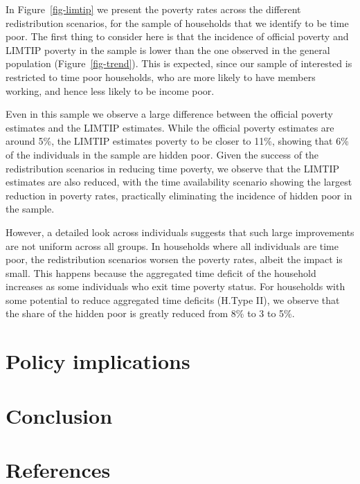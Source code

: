 \documentclass[
  11pt,
]{article}
\begin{document}
In Figure~\ref{fig-limtip} we present the poverty rates across the
different redistribution scenarios, for the sample of households that we
identify to be time poor. The first thing to consider here is that the
incidence of official poverty and LIMTIP poverty in the sample is lower
than the one observed in the general population
(Figure~\ref{fig-trend}). This is expected, since our sample of
interested is restricted to time poor households, who are more likely to
have members working, and hence less likely to be income poor.

Even in this sample we observe a large difference between the official
poverty estimates and the LIMTIP estimates. While the official poverty
estimates are around 5\%, the LIMTIP estimates poverty to be closer to
11\%, showing that 6\% of the individuals in the sample are hidden poor.
Given the success of the redistribution scenarios in reducing time
poverty, we observe that the LIMTIP estimates are also reduced, with the
time availability scenario showing the largest reduction in poverty
rates, practically eliminating the incidence of hidden poor in the
sample.

However, a detailed look across individuals suggests that such large
improvements are not uniform across all groups. In households where all
individuals are time poor, the redistribution scenarios worsen the
poverty rates, albeit the impact is small. This happens because the
aggregated time deficit of the household increases as some individuals
who exit time poverty status. For households with some potential to
reduce aggregated time deficits (H.Type II), we observe that the share
of the hidden poor is greatly reduced from 8\% to 3 to 5\%.

\section{Policy implications}\label{policy-implications}

\section{Conclusion}\label{conclusion}

\section*{References}\label{sec-ref}
\end{document}
